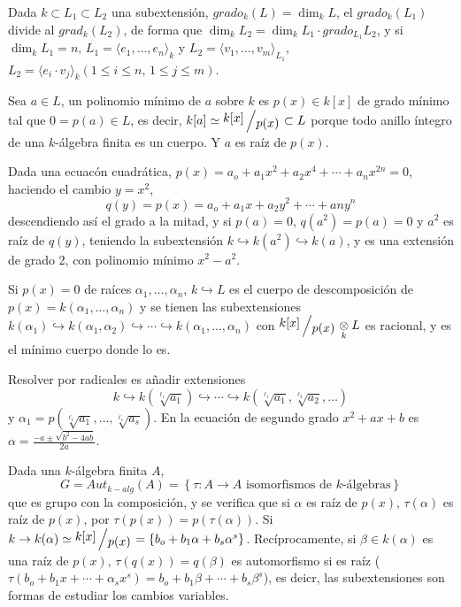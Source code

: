 Dada $k \subset L_1\subset L_2$ una subextensi\'on, $grado_k(L) = \dim_k L$, el $grado_k(L_1)$ divide al $grad_k (L_2)$, de forma que $\dim_k L_2 = \dim_k L_1 \cdot grado_{L_1} L_2$, y si $\dim_k L_1 = n, \, L_1 = \langle e_1, \ldots, e_n\rangle_k$ y $L_2 = \langle v_1, \ldots, v_m \rangle_{L_1}$, $L_2 = \langle e_i \cdot v_j \rangle_{k} (1\leq i \leq n, \, 1\leq j \leq m)$.

Sea $a\in L$, un polinomio m\'inimo de $a$ sobre $k$ es $p(x)\in k[x]$ de grado m\'inimo tal que $0 = p(a)\in L$, es decir, $k[a] \simeq \modulo{k[x]}{p(x)} \subset L $ porque todo anillo \'integro de una $k$-\'algebra finita es un cuerpo. Y $a$ es ra\'iz de $p(x)$. 

Dada una ecuac\'on cuadr\'atica, $p(x) = a_o + a_1x^2 + a_2x^4+\cdots + a_n x^{2n}= 0$, haciendo el cambio $y=x^2$, 
$$q(y)=p(x)=a_o + a_1x+a_2y^2+\cdots + an y^n$$
descendiendo as\'i el grado a la mitad, y si $p(a)=0$, $q(a^2)=p(a) = 0$ y $a^2$ es ra\'iz de $q(y)$, teniendo la subextensi\'on $k \hookrightarrow k(a^2) \hookrightarrow k(a)$, y es una extensi\'on de grado 2, con polinomio m\'inimo $x^2-a^2$. 

Si $p(x)=0$ de ra\'ices $\alpha_1, \ldots, \alpha_n$, $k \hookrightarrow L$ es el cuerpo de descomposici\'on de $p(x) = k(\alpha_1, \ldots, \alpha_n)$ y se tienen las subextensiones $k(\alpha_1) \hookrightarrow k(\alpha_1,\alpha_2) \hookrightarrow \cdots \hookrightarrow  k(\alpha_1, \ldots, \alpha_n)$
con $\modulo{k[x]}{p(x)} \underset{k}{\otimes} L$ es racional, y es el m\'inimo cuerpo donde lo es.

Resolver por radicales es añadir extensiones 
$$k \hookrightarrow k\left( \sqrt[\ell_1]{a_1} \right) \hookrightarrow \cdots \hookrightarrow k\left( \sqrt[\ell_1]{a_1}, \sqrt[\ell_2]{a_2}, \ldots \right) $$ 
y $\alpha_1 = p(\sqrt[\ell_1]{a_1}, \ldots, \sqrt[\ell_s]{a_s})$. En la ecuaci\'on de segundo grado $x^2+ax+b$ es $\alpha=\frac{-a\pm \sqrt{b^2-4ab}}{2a}$. 

Dada una $k$-\'algebra finita $A$, 
$$G=Aut_{k-alg} (A) = \left\{ \tau: A \longrightarrow A\text{ isomorfismos de }k\text{-\'algebras}  \right\}$$ que es grupo con la composici\'on, y se verifica que si $\alpha$ es ra\'iz de $p(x)$, $\tau(\alpha)$ es ra\'iz de $p(x)$, por $\tau(p(x))=p(\tau(\alpha))$. Si $k \to k(\alpha) \simeq \modulo{k[x]}{p(x)} = \{b_o+b_1\alpha + b_s \alpha^s\}$. Rec\'iprocamente, si $\beta \in k(\alpha)$ es una ra\'iz de $p(x)$, $\tau(q(x)) = q(\beta)$ es automorfismo si es ra\'iz ($\tau(b_o + b_1x + \cdots + \alpha_s x^s) = b_o + b_1 \beta + \cdots + b_s \beta^s$), es deicr, las subextensiones son formas de estudiar los cambios variables.

